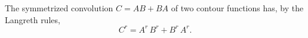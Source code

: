 \documentclass{article}
\begin{document}
The symmetrized convolution $C = AB + BA$ of two contour functions has, by the Langreth rules,
\begin{equation}
C^{r} = A^{r}\,B^{r} + B^{r}\,A^{r} .
\label{eq:sym}
\end{equation}
\end{document}
